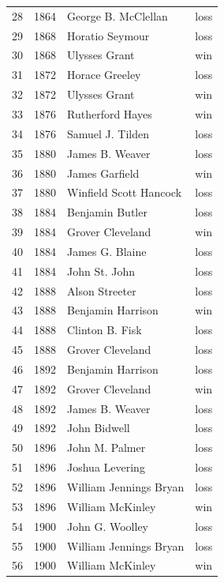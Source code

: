 \documentclass[
  letterpaper,
  DIV=11,
  numbers=noendperiod]{scrreprt}
\begin{document}
\begin{tabular}{lrll}
28  &  1864 &     George B. McClellan &   loss \\
29  &  1868 &         Horatio Seymour &   loss \\
30  &  1868 &           Ulysses Grant &    win \\
31  &  1872 &          Horace Greeley &   loss \\
32  &  1872 &           Ulysses Grant &    win \\
33  &  1876 &        Rutherford Hayes &    win \\
34  &  1876 &        Samuel J. Tilden &   loss \\
35  &  1880 &         James B. Weaver &   loss \\
36  &  1880 &          James Garfield &    win \\
37  &  1880 &  Winfield Scott Hancock &   loss \\
38  &  1884 &         Benjamin Butler &   loss \\
39  &  1884 &        Grover Cleveland &    win \\
40  &  1884 &         James G. Blaine &   loss \\
41  &  1884 &           John St. John &   loss \\
42  &  1888 &          Alson Streeter &   loss \\
43  &  1888 &       Benjamin Harrison &    win \\
44  &  1888 &         Clinton B. Fisk &   loss \\
45  &  1888 &        Grover Cleveland &   loss \\
46  &  1892 &       Benjamin Harrison &   loss \\
47  &  1892 &        Grover Cleveland &    win \\
48  &  1892 &         James B. Weaver &   loss \\
49  &  1892 &            John Bidwell &   loss \\
50  &  1896 &          John M. Palmer &   loss \\
51  &  1896 &         Joshua Levering &   loss \\
52  &  1896 &  William Jennings Bryan &   loss \\
53  &  1896 &        William McKinley &    win \\
54  &  1900 &         John G. Woolley &   loss \\
55  &  1900 &  William Jennings Bryan &   loss \\
56  &  1900 &        William McKinley &    win \\

\end{tabular}
\end{document}

